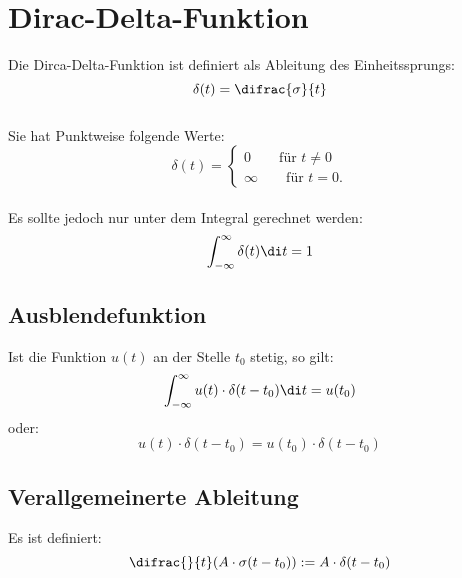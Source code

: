 



\section{Dirac-Delta-Funktion}
Die Dirca-Delta-Funktion ist definiert als Ableitung des Einheitssprungs:
\[
	\delta(t) = \difrac{\sigma}{t}
\]
\\
Sie hat Punktweise folgende Werte:
\[
	\delta(t) = \left\lbrace \begin{matrix}
		0 \qquad \text{für }t \neq 0\\
		\infty \qquad \text{für }t = 0.
	\end{matrix} \right.
\]
\\
Es sollte jedoch nur unter dem Integral gerechnet werden:
\[
	\int_{-\infty}^{\infty} \delta(t) \di t = 1
\]

\subsection{Ausblendefunktion}
Ist die Funktion $u(t)$ an der Stelle $t_0$ stetig, so gilt:
\[
	\int_{-\infty}^{\infty} u(t) \cdot \delta(t-t_0) \di t = u(t_0)
\]
oder:
\[
	u(t) \cdot \delta(t-t_0) = u(t_0) \cdot \delta(t-t_0)
\]

\subsection{Verallgemeinerte Ableitung}
Es ist definiert:
\[
	\difrac{}{t}(A \cdot \sigma(t-t_0)) := A \cdot \delta(t-t_0)
\]